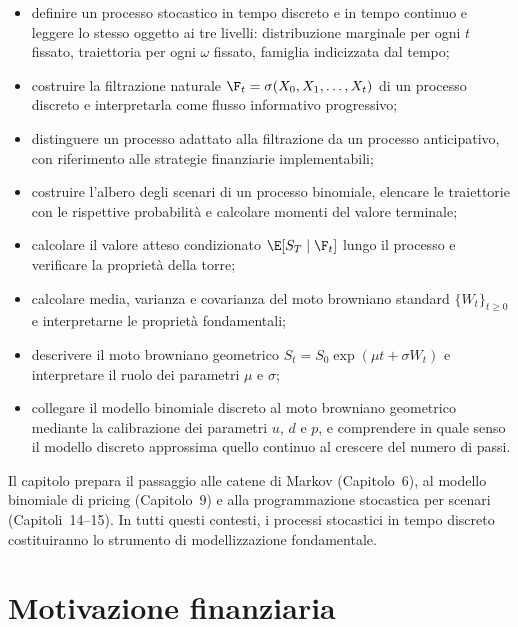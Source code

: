 \begin{itemize}

\item definire un processo stocastico in tempo discreto e in tempo continuo
e leggere lo stesso oggetto ai tre livelli: distribuzione marginale per
ogni $t$ fissato, traiettoria per ogni $\omega$ fissato, famiglia indicizzata
dal tempo;

\item costruire la filtrazione naturale $\F_t=\sigma(X_0,X_1,\ldots,X_t)$
di un processo discreto e interpretarla come flusso informativo progressivo;

\item distinguere un processo adattato alla filtrazione da un processo
anticipativo, con riferimento alle strategie finanziarie implementabili;

\item costruire l'albero degli scenari di un processo binomiale, elencare
le traiettorie con le rispettive probabilit\`{a} e calcolare momenti del
valore terminale;

\item calcolare il valore atteso condizionato $\E[S_T\mid\F_t]$ lungo
il processo e verificare la propriet\`{a} della torre;

\item calcolare media, varianza e covarianza del moto browniano standard
$\{W_t\}_{t\geq 0}$ e interpretarne le propriet\`{a} fondamentali;

\item descrivere il moto browniano geometrico $S_t=S_0\exp(\mu
t+\sigma W_t)$ e interpretare il ruolo dei parametri $\mu$ e $\sigma$;

\item collegare il modello binomiale discreto al moto browniano geometrico
mediante la calibrazione dei parametri $u$, $d$ e $p$, e comprendere
in quale senso il modello discreto approssima quello continuo al crescere
del numero di passi.

\end{itemize}

Il capitolo prepara il passaggio alle catene di Markov (Capitolo~6), al
modello binomiale di pricing (Capitolo~9) e alla programmazione stocastica
per scenari (Capitoli~14--15). In tutti questi contesti, i processi
stocastici in tempo discreto costituiranno lo strumento di modellizzazione
fondamentale.

\section{Motivazione finanziaria}

